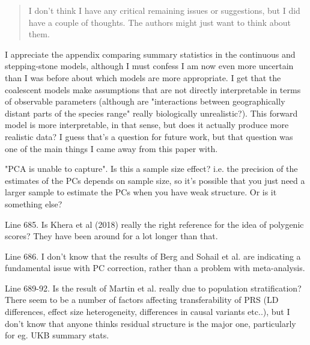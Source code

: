 \begin{quote}
I don't think I have any critical remaining issues or suggestions, but I did have a couple of thoughts. The authors might just want to think about them.
\end{quote}

\begin{point}{}
I appreciate the appendix comparing summary statistics in the continuous and stepping-stone models, although I must confess I am now even more uncertain than I was before about which models are more appropriate. I get that the coalescent models make assumptions that are not directly interpretable in terms of observable parameters (although are "interactions between geographically distant parts of the species range" really biologically unrealistic?). This forward model is more interpretable, in that sense, but does it actually produce more realistic data? I guess that's a question for future work, but that question was one of the main things I came away from this paper with.
\end{point}

\reply{
}

\begin{point}{\revref}
 "PCA is unable to capture". Is this a sample size effect? i.e. the precision of the estimates of the PCs depends on sample size, so it's possible that you just need a larger sample to estimate the PCs when you have weak structure. Or is it something else?
\end{point}

\reply{
}

\begin{point}{Line 685.}
 Is Khera et al (2018) really the right reference for the idea of polygenic scores? They have been around for a lot longer than that.
\end{point}

\reply{
}

\begin{point}{Line 686. }
 I don't know that the results of Berg and Sohail et al. are indicating a fundamental issue with PC correction, rather than a problem with meta-analysis.
\end{point}

\reply{
}

\begin{point}{Line 689-92. }
 Is the result of Martin et al. really due to population stratification? There seem to be a number of factors affecting transferability of PRS (LD differences, effect size heterogeneity, differences in causal variants etc..), but I don't know that anyone thinks residual structure is the major one, particularly for eg. UKB summary stats.
\end{point}

